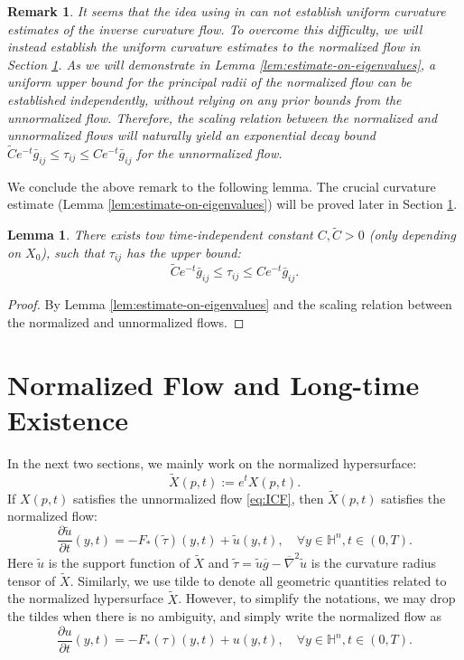 \documentclass[10pt,a4paper]{amsart}
\newtheorem{lemma}[theorem]{Lemma}
\newtheorem{remark}[theorem]{Remark}
\renewcommand{\H}{{\mathbb{H}}}
\newcommand{\pd}[2]{\frac{\partial {#1}}{\partial {#2}}}
\newcommand{\bg}{\bar{g}}
\numberwithin{equation}{section}
\begin{document}
\begin{remark}\label{rem:curvature-estimate}
   It seems that the idea using in  \cite{co-compact} can not  establish uniform curvature estimates of the inverse curvature flow. To overcome this difficulty, we will instead establish the uniform curvature estimates to the normalized flow in Section \ref{sec:normalized-flow}. As we will demonstrate in Lemma \ref{lem:estimate-on-eigenvalues}, a uniform upper bound for the principal radii of the normalized flow can be established independently, without relying on any prior bounds from the unnormalized flow. Therefore, the scaling relation between the normalized and unnormalized flows will naturally yield an exponential decay bound $\tilde{C}e^{-t}\bg_{ij} \leq \tau_{ij} \leq C e^{-t}\bg_{ij}$ for the unnormalized flow.
\end{remark}

We conclude the above remark to the following lemma. The crucial curvature estimate (Lemma \ref{lem:estimate-on-eigenvalues}) will be proved later in Section \ref{sec:normalized-flow}.
\begin{lemma}
    There exists tow time-independent constant \(C,\tilde{C} > 0\) (only depending on \(X_0\)), such that \(\tau_{ij}\) has the upper bound:
    \begin{equation}\label{eq:max radii estimate}
       \tilde{C}e^{-t}\bg_{ij}\leq  \tau_{ij} \leq C e^{-t}\bg_{ij}.
    \end{equation}
\end{lemma}
\begin{proof}
    By Lemma \ref{lem:estimate-on-eigenvalues} and the scaling relation between the normalized and unnormalized flows.
\end{proof}



\section{Normalized Flow and Long-time Existence}\label{sec:normalized-flow}
In the next two sections, we mainly work on the normalized hypersurface: 
\begin{equation}
    \tilde{X}(p,t) := e^t X(p,t).
\end{equation}
If \(X(p,t)\) satisfies the unnormalized flow \eqref{eq:ICF}, then \(\tilde{X}(p,t)\) satisfies the normalized flow:  
\[ \pd{\tilde{u}}{t}(y,t) = -F_*(\tilde{\tau})(y,t) + \tilde{u}(y,t), \quad \forall y\in \H^n, t\in (0,T). \]
Here \(\tilde{u}\)  is the support function of \(\tilde{X}\) and $\tilde{\tau}=\tilde{u}\overline{g}-\overline{\nabla}^2\tilde{u}$
is the curvature radius tensor of $\tilde{X}$. Similarly, we use tilde to denote all geometric quantities related to the normalized hypersurface \(\tilde{X}\). However, to simplify the notations, we may drop the tildes when there is no ambiguity, and simply write the normalized flow as 
\begin{equation}\label{eq:normalized-flow} 
    \pd{u}{t}(y,t) = -F_*(\tau)(y,t) + u(y,t), \quad \forall y\in \H^n, t\in (0,T). 
\end{equation}
\end{document}

